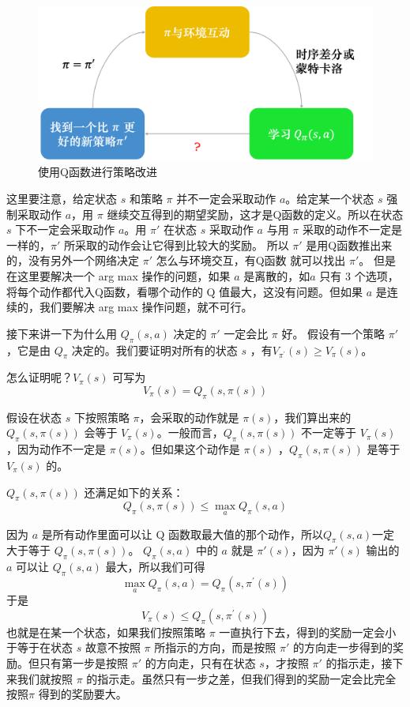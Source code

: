 \begin{figure}[hbt]
    \centering
    \includegraphics[width=0.5\linewidth]{res/ch6/6.9}
    \caption{使用Q函数进行策略改进}
    \label{fig:fig6.9}
\end{figure}

这里要注意，给定状态 $s$ 和策略 $\pi$  并不一定会采取动作 $a$。给定某一个状态 $s$ 强制采取动作 $a$，用 $\pi$  继续交互得到的期望奖励，这才是Q函数的定义。所以在状态 $s$ 下不一定会采取动作 $a$。用 $\pi'$ 在状态 $s$ 采取动作 $a$ 与用 $\pi$ 采取的动作不一定是一样的，$\pi'$ 所采取的动作会让它得到比较大的奖励。
所以 $\pi'$ 是用Q函数推出来的，没有另外一个网络决定 $\pi'$ 怎么与环境交互，有Q函数 就可以找出 $\pi'$。
但是在这里要解决一个 arg max 操作的问题，如果 $a$ 是离散的，如$a$ 只有 3 个选项，将每个动作都代入Q函数，看哪个动作的 Q 值最大，这没有问题。但如果 $a$ 是连续的，我们要解决 arg max 操作问题，就不可行。

接下来讲一下为什么用 $Q_{\pi}(s,a)$ 决定的 $\pi'$ 一定会比 $\pi$ 好。
假设有一个策略 $\pi'$，它是由 $Q_{\pi}$ 决定的。我们要证明对所有的状态 $s$ ，有$V_{\pi^{\prime}}(s) \geqslant V_{\pi}(s)$。

怎么证明呢？$V_{\pi}(s)$ 可写为
\begin{equation}
    \label{eq:}
    V_{\pi}(s)=Q_{\pi}(s, \pi(s))
\end{equation}

假设在状态 $s$ 下按照策略 $\pi$，会采取的动作就是 $\pi(s)$，我们算出来的 $Q_{\pi}(s, \pi(s))$ 会等于 $V_{\pi}(s)$。一般而言，$Q_{\pi}(s, \pi(s))$ 不一定等于 $V_{\pi}(s)$ ，因为动作不一定是 $\pi(s)$。但如果这个动作是 $\pi(s)$ ，$Q_{\pi}(s, \pi(s))$ 是等于 $V_{\pi}(s)$ 的。

$Q_{\pi}(s, \pi(s))$ 还满足如下的关系：
\begin{equation}
    \label{eq:}
    Q_{\pi}(s, \pi(s)) \leqslant \max _{a} Q_{\pi}(s, a)
\end{equation}

因为 $a$ 是所有动作里面可以让 Q 函数取最大值的那个动作，所以$Q_{\pi}(s, a)$一定大于等于 $Q_{\pi}(s, \pi(s))$。
$Q_{\pi}(s, a)$ 中的 $a$ 就是 $\pi'(s)$，因为 $\pi'(s)$ 输出的 $a$ 可以让 $Q_\pi(s,a)$ 最大，所以我们可得
\begin{equation}
    \label{eq:}
    \max _{a} Q_{\pi}(s, a)=Q_{\pi}\left(s, \pi^{\prime}(s)\right)
\end{equation}
于是
$$
V_{\pi}(s) \leqslant Q_{\pi}\left(s, \pi^{\prime}(s)\right)
$$
也就是在某一个状态，如果我们按照策略 $\pi$ 一直执行下去，得到的奖励一定会小于等于在状态 $s$ 故意不按照 $\pi$ 所指示的方向，而是按照 $\pi'$ 的方向走一步得到的奖励。但只有第一步是按照 $\pi'$ 的方向走，只有在状态 $s$，才按照 $\pi'$ 的指示走，接下来我们就按照 $\pi$ 的指示走。虽然只有一步之差，但我们得到的奖励一定会比完全按照$\pi$ 得到的奖励要大。


